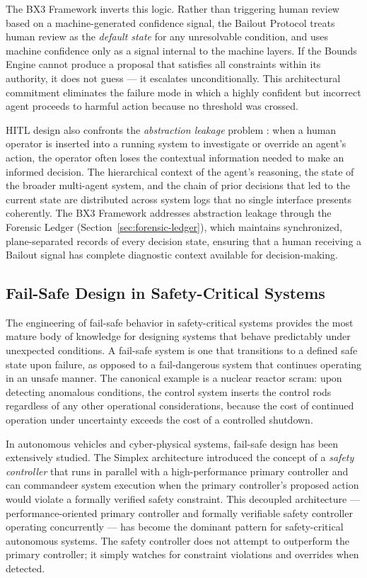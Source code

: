 The BX3 Framework inverts this logic. Rather than triggering human review based on a machine-generated confidence signal, the Bailout Protocol treats human review as the \textit{default state} for any unresolvable condition, and uses machine confidence only as a signal internal to the machine layers. If the Bounds Engine cannot produce a proposal that satisfies all constraints within its authority, it does not guess --- it escalates unconditionally. This architectural commitment eliminates the failure mode in which a highly confident but incorrect agent proceeds to harmful action because no threshold was crossed.

HITL design also confronts the \textit{abstraction leakage} problem \cite{trist81}: when a human operator is inserted into a running system to investigate or override an agent's action, the operator often loses the contextual information needed to make an informed decision. The hierarchical context of the agent's reasoning, the state of the broader multi-agent system, and the chain of prior decisions that led to the current state are distributed across system logs that no single interface presents coherently. The BX3 Framework addresses abstraction leakage through the Forensic Ledger (Section~\ref{sec:forensic-ledger}), which maintains synchronized, plane-separated records of every decision state, ensuring that a human receiving a Bailout signal has complete diagnostic context available for decision-making.

\subsection{Fail-Safe Design in Safety-Critical Systems}

The engineering of fail-safe behavior in safety-critical systems provides the most mature body of knowledge for designing systems that behave predictably under unexpected conditions. A fail-safe system is one that transitions to a defined safe state upon failure, as opposed to a fail-dangerous system that continues operating in an unsafe manner. The canonical example is a nuclear reactor scram: upon detecting anomalous conditions, the control system inserts the control rods regardless of any other operational considerations, because the cost of continued operation under uncertainty exceeds the cost of a controlled shutdown.

In autonomous vehicles and cyber-physical systems, fail-safe design has been extensively studied. The Simplex architecture \cite{bansal2019} introduced the concept of a \textit{safety controller} that runs in parallel with a high-performance primary controller and can commandeer system execution when the primary controller's proposed action would violate a formally verified safety constraint. This decoupled architecture --- performance-oriented primary controller and formally verifiable safety controller operating concurrently --- has become the dominant pattern for safety-critical autonomous systems. The safety controller does not attempt to outperform the primary controller; it simply watches for constraint violations and overrides when detected.

